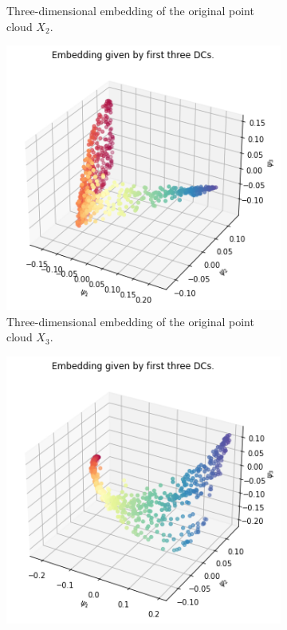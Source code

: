 \begin{figure}[H]
\begin{subfigure}[b]{0.3\textwidth}
    \caption{Three-dimensional embedding of the original point cloud $X_2$.}
\end{subfigure}
\hfill
\begin{subfigure}[b]{0.3\textwidth}
    \includegraphics[width=\textwidth]{figures/X3_embedding.png}
    \caption{Three-dimensional embedding of the original point cloud $X_3$.}
\end{subfigure}
\hfill
\begin{subfigure}[b]{0.3\textwidth}
    \includegraphics[width=\textwidth]{figures/X4_embedding.png}

\end{subfigure}
\end{figure}
